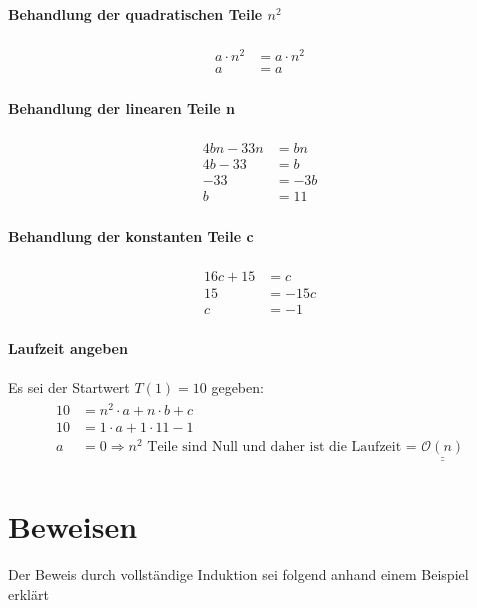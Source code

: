 \paragraph{Behandlung der quadratischen Teile $n^2$}
\begin{align}
\begin{split}
	a \cdot n^2 &= a \cdot n^2 \\
	a &= a
\end{split}
\end{align}

\paragraph{Behandlung der linearen Teile n}
\begin{align}
\begin{split}
	4bn - 33n &= bn \\
	4b - 33 &= b \\
	-33 &= -3b \\
	b &= 11
\end{split}
\end{align}

\paragraph{Behandlung der konstanten Teile c}
\begin{align}
\begin{split}
	16c + 15 &= c \\
	15 &= -15c \\
	c &= -1
\end{split}
\end{align}

\paragraph{Laufzeit angeben}
Es sei der Startwert $T(1) = 10$ gegeben:
\begin{align}
\begin{split}
10 &= n^2\cdot a + n \cdot b + c \\
10 &= 1\cdot a + 1 \cdot 11 - 1 \\
a &= 0 \Rightarrow n^2 \text{ Teile sind Null und daher ist die Laufzeit = } \underline{\underline{\mathcal{O}(n)}}
\end{split}
\end{align}

\section{Beweisen}
Der Beweis durch vollständige Induktion sei folgend anhand einem Beispiel erklärt

